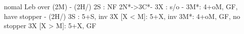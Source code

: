 nomal Leb over (2M) - 
(2H/) 2S : NF
2N*->3C*- 3X : s/o
        - 3M*: 4+oM, GF, have stopper
        - (2H/) 3S : 5+S, inv
3X [X < M]: 5+X, inv
3M*: 4+oM, GF, no stopper
3X [X > M]: 5+X, GF
